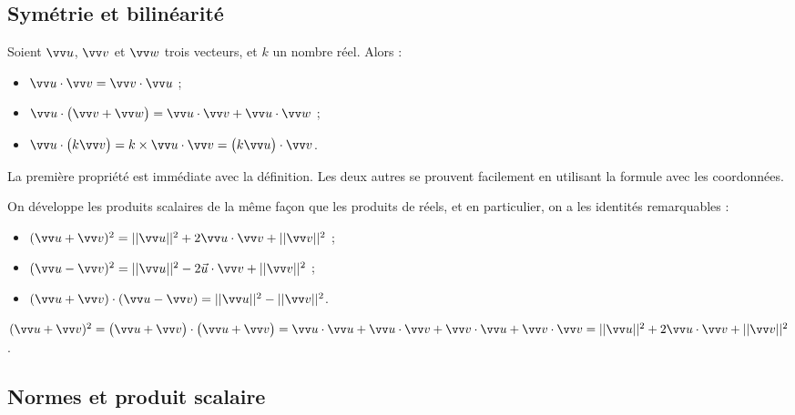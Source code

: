 \documentclass[a4paper,11pt]{article}
\begin{document}
\subsection{Symétrie et bilinéarité}

\begin{cprop}[s]
Soient $\vect{u}$, $\vect{v}$ et $ \vect{w}$ trois vecteurs, et $k$ un nombre réel. Alors :
\begin{itemize}
	\item $\vect{u}\cdot\vect{v}=\vect{v}\cdot\vect{u}$ ;
	\item $\vect{u}\cdot\big(\vect{v}+ \vect{w}\big)=\vect{u}\cdot\vect{v} + \vect{u}\cdot\vect{w}$ ;
	\item $\vect{u}\cdot\big(k\vect{v}\big)=k \times \vect{u}\cdot\vect{v} = \big(k\vect{u}\big)\cdot\vect{v}$.
\end{itemize}
\end{cprop}

\begin{cdemo}
La première propriété est immédiate avec la définition. Les deux autres se prouvent facilement en utilisant la formule avec les coordonnées.
\end{cdemo}

\begin{ccscq}
On développe les produits scalaires de la même façon que les produits de réels, et en particulier, on a les identités remarquables :
\begin{itemize}
	\item $(\vect{u}+\vect{v})^2=||\vect{u}||^2+2\vect{u}\cdot\vect{v}+||\vect{v}||^2$ ;
	\item $(\vect{u}-\vect{v})^2=||\vect{u}||^2-2\vec{u}\cdot\vect{v}+||\vect{v}||^2$ ;
	\item $(\vect{u}+\vect{v})\cdot(\vect{u}-\vect{v})=||\vect{u}||^2-||\vect{v}||^2$.
\end{itemize}
\end{ccscq}

\begin{cdemo}
$(\vect{u}+\vect{v})^2=\big(\vect{u}+\vect{v}\big)\cdot\big(\vect{u}+\vect{v}\big)=\vect{u}\cdot\vect{u}+\vect{u}\cdot\vect{v}+\vect{v}\cdot\vect{u}+\vect{v}\cdot\vect{v}=||\vect{u}||^2+2\vect{u}\cdot\vect{v}+||\vect{v}||^2$.
\end{cdemo}

\subsection{Normes et produit scalaire}
\end{document}
